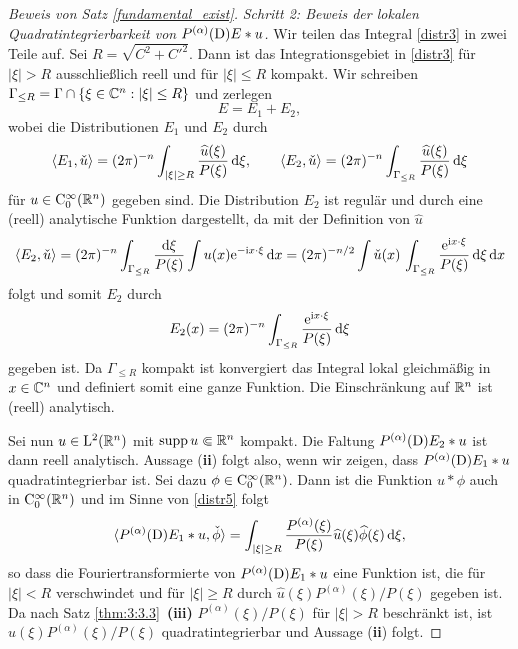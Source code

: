 \begin{proof}[Beweis von Satz \ref{fundamental_exist}]
\medskip
\noindent
{\em Schritt 2: Beweis der lokalen Quadratintegrierbarkeit von $P^{(\alpha)}(\mathrm D) E * u$.}
Wir teilen das Integral \eqref{distr3} in zwei Teile auf. Sei $R=\sqrt{C^2 + C'^2}$. Dann ist das Integrationsgebiet in \eqref{distr3} für $|\xi|>R$ ausschließlich reell 
und für $|\xi|\le R$ kompakt. Wir schreiben $\Gamma_{\le R} = \Gamma\cap\{\xi\in\mathbb C^n : |\xi|\le R\}$ und zerlegen
\begin{equation}\label{distr4}
E=E_1 + E_2,
\end{equation}
wobei die Distributionen $E_1$ und $E_2$ durch
\begin{equation}\label{distr5}
\langle E_1,\check u\rangle = (2\pi)^{-n} \int_{|\xi|\ge R} \frac{\widehat u(\xi)}{P(\xi)}\,\mathrm d\xi, \qquad 
\langle E_2, \check u\rangle = (2\pi)^{-n} \int_{\Gamma_{\le R}} \frac{\widehat u(\xi)}{P(\xi)}\,\mathrm d \xi
\end{equation}
für $u\in\mathrm C_0^\infty(\mathbb R^n)$ gegeben sind. Die Distribution $E_2$ ist regulär und durch eine (reell) analytische 
Funktion dargestellt, da mit der Definition von $\widehat u$
\begin{equation}
\langle E_2, \check u\rangle = (2\pi)^{-n} \int_{\Gamma_{\le R}} \frac{\mathrm d\xi}{P(\xi)} \int u(x) \mathrm e^{-\mathrm i x\cdot\xi}\,\mathrm d x= (2\pi)^{-n/2} \int \check u(x) \, \int_{\Gamma_{\le R}}\frac{\mathrm e^{\mathrm i x\cdot \xi}}{P(\xi)}\,\mathrm d \xi \,\mathrm d x
\end{equation}
folgt und somit $E_2$ durch
\begin{equation}
 E_2(x) = (2\pi)^{-n} \int_{\Gamma_{\le R}} \frac{\mathrm e^{\mathrm i x\cdot \xi}}{P(\xi)}\,\mathrm d \xi
\end{equation}
gegeben ist. Da $\Gamma_{\le R}$ kompakt ist konvergiert das Integral lokal gleichmäßig in $x\in\mathbb C^n$ und definiert somit eine ganze Funktion. Die Einschränkung auf $\mathbb R^n$ ist (reell) analytisch. 

Sei nun $u\in \mathrm L^2(\mathbb R^n)$ mit $\operatorname{supp} u\Subset\mathbb R^n$ kompakt. Die Faltung $P^{(\alpha)}(\mathrm D)E_2 *u$ ist dann reell analytisch.  Aussage ({\bf ii}) folgt also, wenn wir zeigen, dass $P^{(\alpha)}(\mathrm D) E_1 * u$ quadratintegrierbar ist.  Sei  dazu $\phi \in\mathrm C_0^\infty(\mathbb R^n)$. Dann ist die Funktion $u*\phi$ auch in $\mathrm C_0^\infty(\mathbb R^n)$ und im Sinne von \eqref{distr5} folgt
\begin{equation}
\langle P^{(\alpha)} (\mathrm D) E_1 * u, \check \phi\rangle  
= \int_{|\xi|\ge R} \frac{P^{(\alpha)}(\xi)}{P(\xi)} \widehat u(\xi) \widehat \phi(\xi) \,\mathrm d \xi,
\end{equation}     
so dass die Fouriertransformierte von $P^{(\alpha)}(\mathrm D) E_1 * u$ eine Funktion ist, die für $|\xi|<R$ verschwindet und für $|\xi|\ge R$ durch $\widehat u(\xi)P^{(\alpha)}(\xi)/P(\xi)$ gegeben ist. Da nach Satz \ref{thm:3:3.3}~{\bf (iii)} $P^{ (\alpha)}(\xi)/P(\xi)$ für $|\xi|>R$ beschränkt ist, ist  $\widehat u(\xi)P^{(\alpha)}(\xi)/P(\xi)$
quadratintegrierbar und Aussage ({\bf ii}) folgt.


\end{proof}
